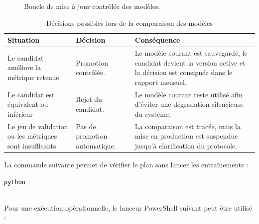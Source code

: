 \begin{figure}[H]
{
}
\caption{Boucle de mise à jour contrôlée des modèles.}
\label{fig:reentrainement-controle}
\end{figure}

\begin{table}[H]
\centering
\caption{Décisions possibles lors de la comparaison des modèles}
\label{tab:decisions-reentrainement}
\scriptsize
\begin{tabularx}{\textwidth}{p{3.1cm}p{4.1cm}X}
\toprule
\textbf{Situation} & \textbf{Décision} & \textbf{Conséquence} \tabularnewline
\midrule
Le candidat améliore la métrique retenue &
Promotion contrôlée. &
Le modèle courant est sauvegardé, le candidat devient la version active et la décision est consignée dans le rapport mensuel. \tabularnewline
Le candidat est équivalent ou inférieur &
Rejet du candidat. &
Le modèle courant reste utilisé afin d'éviter une dégradation silencieuse du système. \tabularnewline
Le jeu de validation ou les métriques sont insuffisants &
Pas de promotion automatique. &
La comparaison est tracée, mais la mise en production est suspendue jusqu'à clarification du protocole. \tabularnewline
\bottomrule
\end{tabularx}
\end{table}

La commande suivante permet de vérifier le plan sans lancer les entraînements :

\begin{center}
\texttt{python} \\
\\
\end{center}

Pour une exécution opérationnelle, le lanceur PowerShell suivant peut être utilisé :

\begin{center}
\end{center}

